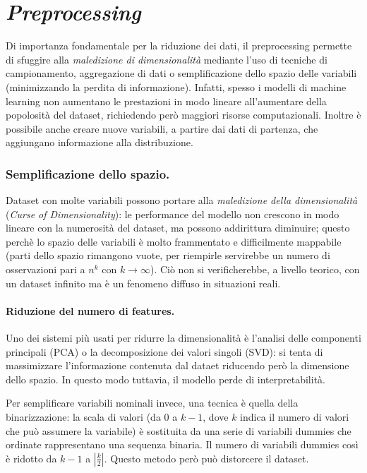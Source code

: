 \documentclass[11pt, a4page, twocolumn]{article}
\begin{document}
\newpage
\part{\textit{Preprocessing}}
Di importanza fondamentale per la riduzione dei dati, il preprocessing permette di sfuggire alla \textit{maledizione di dimensionalità} mediante l'uso di tecniche di campionamento, aggregazione di dati o semplificazione dello spazio delle variabili (minimizzando la perdita di informazione).
Infatti, spesso i modelli di machine learning non aumentano le prestazioni in modo lineare all'aumentare della popolosità del dataset, richiedendo però maggiori risorse computazionali.
Inoltre è possibile anche creare nuove variabili, a partire dai dati di partenza, che aggiungano informazione alla distribuzione.


\section{Semplificazione dello spazio.}
Dataset con molte variabili possono portare alla \textit{maledizione della dimensionalità} (\textit{Curse of Dimensionality}): le performance del modello non crescono in modo lineare con la numerosità del dataset, ma possono addirittura diminuire; questo perchè lo spazio delle variabili è molto frammentato e difficilmente mappabile (parti dello spazio rimangono vuote, per riempirle servirebbe un numero di osservazioni pari a $n^k$ con $k \to \infty$).
Ciò non si verificherebbe, a livello teorico, con un dataset infinito ma è un fenomeno diffuso in situazioni reali.

\subsection{Riduzione del numero di features.}
Uno dei sistemi più usati per ridurre la dimensionalità è l'analisi delle componenti principali (PCA) o la decomposizione dei valori singoli (SVD): si tenta di massimizzare l'informazione contenuta dal dataet riducendo però la dimensione dello spazio.
In questo modo tuttavia, il modello perde di interpretabilità.

Per semplificare variabili nominali invece, una tecnica è quella della binarizzazione: la scala di valori (da $0$ a $k-1$, dove $k$ indica il numero di valori che può assumere la variabile) è sostituita da una serie di variabili dummies che ordinate rappresentano una sequenza binaria.
Il numero di variabili dummies così è ridotto da $k-1$ a $|\frac{k}{2}|$.
Questo metodo però può distorcere il dataset.
\end{document}
